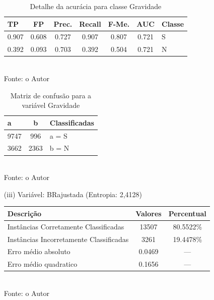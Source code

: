 \begin{enumerate}
	
	\begin{table}[!ht]
		\centering
		\caption{Detalhe da acurácia para classe Gravidade}
		\vspace{1mm}
		\begin{tabular}{l|c|c|c|c|c|l}
			\hline
			\textbf{TP} & \textbf{FP} & \textbf{Prec.} & \textbf{Recall} & \textbf{F-Me.} & \textbf{AUC} & \textbf{Classe} \\
			\hline
			0.907 & 0.608 & 0.727 & 0.907 & 0.807 & 0.721 & S \\
			0.392 & 0.093 & 0.703 & 0.392 & 0.504 & 0.721 & N \\
				
		\end{tabular}
		\\
		\tiny Fonte: o Autor
	\end{table}
	
	\begin{table}[!ht]
		\centering
		\caption{Matriz de confusão para a variável Gravidade}
		\vspace{1mm}
		\begin{tabular}{l|c|l}
			\hline
			\textbf{a} & \textbf{b} & \textbf{Classificadas}\\
			\hline
			9747 & 996 & a = S \\
			3662 & 2363 & b = N \\
		\end{tabular}
		\\
		\tiny Fonte: o Autor
	\end{table}
	
\pagebreak
	
	\item[(iii)] Variável: BRajustada (Entropia: 2,4128)
	\begin{table}[!ht]
		\centering
		\vspace{1mm}
		\begin{tabular}{l|c|c}
			\hline
			\textbf{Descrição} & \textbf{Valores} & \textbf{Percentual} \\
			\hline
			Instâncias Corretamente Classificadas & 13507 & 80.5522\% \\
			Instâncias Incorretamente Classificadas & 3261 & 19.4478\% \\
			Erro médio absoluto & 0.0469 & ---  \\
			Erro médio quadratico & 0.1656 & --- \\
		\end{tabular}
		\\
		\tiny Fonte: o Autor
	\end{table}
	

\end{enumerate}

